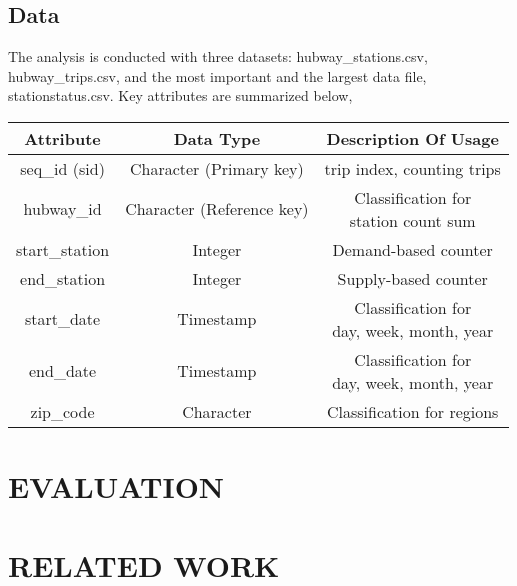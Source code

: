 \documentclass[journal, letterpaper]{IEEEtran}
\begin{document}
\subsection{Data}
The analysis is conducted with three datasets: hubway\_stations.csv, hubway\_trips.csv, and the most important and the largest data file, stationstatus.csv. Key attributes are summarized below, 
\begin{table}[ht]
\centering %
\begin{tabular}{c| c| c} %
\hline\hline %
Attribute & Data Type & Description Of Usage  \\  %
\hline %
seq\_id (sid) & Character (Primary key) & trip index, counting trips  \\ %
\hline
hubway\_id & Character (Reference key) & \pbox{20cm}{Classification for \\ station count sum}  \\
\hline
start\_station & Integer & Demand-based counter  \\
\hline
end\_station & Integer & Supply-based counter   \\
\hline
start\_date & Timestamp & \pbox{20cm}{Classification for \\ day, week, month, year}  \\  %
\hline
end\_date & Timestamp & \pbox{20cm}{Classification for \\ day, week, month, year} \\
\hline
zip\_code & Character & Classification for regions \\
\hline %
\end{tabular}
\label{table:nonlin} %
\end{table}

\section{EVALUATION}
\large
\section{RELATED WORK}
\large
\end{document}
